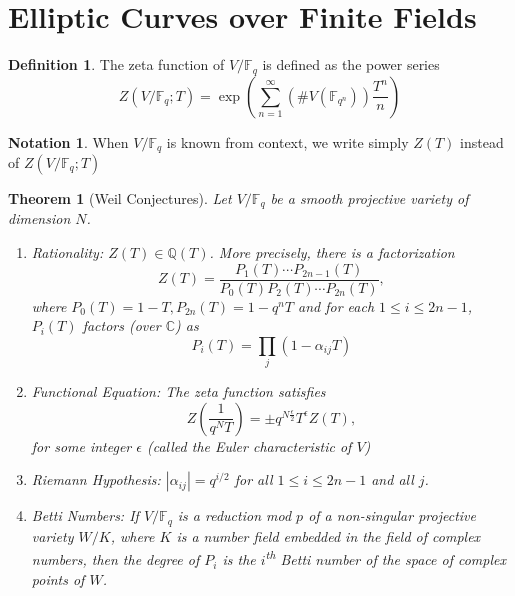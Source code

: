 \documentclass{article}
\newtheorem{theorem}{Theorem}[section]
\theoremstyle{definition}
\newtheorem{definition}{Definition}[section]
\newtheorem*{notation}{Notation}
\theoremstyle{remark}
\newcommand{\F}{\mathbb{F}}
\newcommand{\C}{\mathbb{C}}
\newcommand{\Q}{\mathbb{Q}}
\begin{document}
\section{Elliptic Curves over Finite Fields}

\begin{definition}
	The zeta function of $V/\F_q$ is defined as the power series
	\begin{equation*}
		Z(V/\F_q; T) = \exp\left(\sum_{n=1}^\infty (\#V(\F_{q^n}))
		\frac{T^n}{n}\right)
	\end{equation*}
\end{definition}

\begin{notation}
	When $V/\F_q$ is known from context, we write simply $Z(T)$
	instead of $Z(V/\F_q; T)$
\end{notation}

\begin{theorem}[Weil Conjectures]
	Let $V/\F_q$ be a smooth projective variety of dimension $N$.
	\begin{enumerate}[label=(\alph*)]
		\item Rationality: $Z(T) \in \Q(T)$. More precisely, 
			there is a factorization
			\begin{equation*}
				Z(T) = \frac{P_1(T)\cdots P_{2n-1}(T)}
				{P_0(T)P_2(T) \cdots P_{2n}(T)},
			\end{equation*}
			where $P_0(T) = 1 - T, P_{2n}(T) = 1 - q^nT$ and for each
			$1 \leq i \leq 2n - 1$, $P_i(T)$ factors (over $\C$) as
			\begin{equation*}
				P_i(T) = \prod_j (1 - \alpha_{ij}T)
			\end{equation*}
		\item Functional Equation: The zeta function satisfies
			\begin{equation*}
				Z\left(\frac{1}{q^NT}\right) = \pm q^{N\frac{\epsilon}{2}}
				T^{\epsilon} Z(T),
			\end{equation*}
			for some integer $\epsilon$ (called the Euler characteristic of $V$)
		\item Riemann Hypothesis: $|\alpha_{ij}| = q^{i/2}$
			for all $1 \leq i \leq 2n - 1$ and all $j$.
		\item Betti Numbers: If $V/\F_q$ is a reduction mod $p$ of a
			non-singular projective variety $W/K$, where $K$ is a number
			field embedded in the field of complex numbers, then the degree
			of $P_i$ is the $i$\textsuperscript{th} Betti number of the space
			of complex points of $W$.
	\end{enumerate}
\end{theorem}
\end{document}
